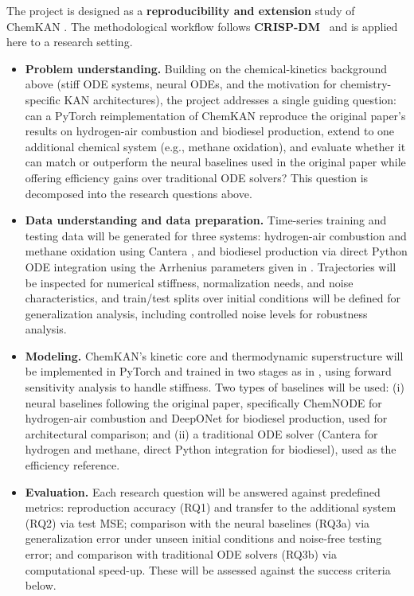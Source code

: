\documentclass[11pt,a4paper]{article}
\begin{document}
The project is designed as a \textbf{reproducibility and extension} study of ChemKAN \cite{Koenig_2025}. The methodological workflow follows \textbf{CRISP-DM}~\cite{Chapman2000CRISPDM} and is applied here to a research setting.
\begin{itemize}

    \item \textbf{Problem understanding.}
    Building on the chemical-kinetics background above (stiff ODE systems, neural ODEs, and the motivation for chemistry-specific KAN architectures), the project addresses a single guiding question: can a PyTorch reimplementation of ChemKAN \cite{Koenig_2025} reproduce the original paper's results on hydrogen-air combustion and biodiesel production, extend to one additional chemical system (e.g., methane oxidation), and evaluate whether it can match or outperform the neural baselines used in the original paper while offering efficiency gains over traditional ODE solvers? This question is decomposed into the research questions above.

    \item \textbf{Data understanding and data preparation.}
    Time-series training and testing data will be generated for three systems: hydrogen-air combustion and methane oxidation using Cantera \cite{cantera}, and biodiesel production via direct Python ODE integration using the Arrhenius parameters given in \cite{Koenig_2025}. Trajectories will be inspected for numerical stiffness, normalization needs, and noise characteristics, and train/test splits over initial conditions will be defined for generalization analysis, including controlled noise levels for robustness analysis.

    \item \textbf{Modeling.}
    ChemKAN's kinetic core and thermodynamic superstructure will be implemented in PyTorch and trained in two stages as in \cite{Koenig_2025}, using forward sensitivity analysis to handle stiffness. Two types of baselines will be used: (i) neural baselines following the original paper, specifically ChemNODE \cite{OWOYELE2022100118} for hydrogen-air combustion and DeepONet \cite{lu2019deeponet} for biodiesel production, used for architectural comparison; and (ii) a traditional ODE solver (Cantera for hydrogen and methane, direct Python integration for biodiesel), used as the efficiency reference.
    
    \item \textbf{Evaluation.}
    Each research question will be answered against predefined metrics: reproduction accuracy (RQ1) and transfer to the additional system (RQ2) via test MSE; comparison with the neural baselines (RQ3a) via generalization error under unseen initial conditions and noise-free testing error; and comparison with traditional ODE solvers (RQ3b) via computational speed-up. These will be assessed against the success criteria below.


\end{itemize}
\end{document}
